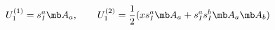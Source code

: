 \begin{equation}
U_{1}^{(1)}=s_{I}^{a}{\mb A}_{a}, \qquad U_{1}^{(2)}=\frac{1}{2}(x s_{I}^{a}{\mb A}_{a}+ s_{I}^{a}s_{I}^{b}{\mb A}_{a}{\mb A}_{b})
\end{equation}

